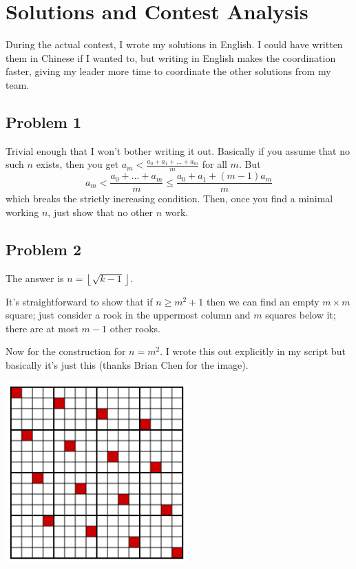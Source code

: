 \documentclass[11pt]{scrreprt}
\numberwithin{figure}{chapter}
\begin{document}
\chapter{Solutions and Contest Analysis}
\label{ch:solnsketch}
During the actual contest, I wrote my solutions in English.
I could have written them in Chinese if I wanted to, but writing in English makes
the coordination faster, giving my leader more time to coordinate the other
solutions from my team.
\section{Problem 1}
Trivial enough that I won't bother writing it out.
Basically if you assume that no such $n$ exists, then you get $a_m < \frac{a_0+a_1+ \dots + a_m}{m}$ for all $m$. But
\[ a_m < \frac{a_0+ \dots + a_m}{m} \le \frac{a_0+a_1 + (m-1)a_m}{m} \]
which breaks the strictly increasing condition.
Then, once you find a minimal working $n$, just show that no other $n$ work.

\section{Problem 2}
The answer is $n = \left\lfloor \sqrt{k-1} \right\rfloor$.

It's straightforward to show that if $n \ge m^2+1$ then we can find an empty $m \times m$ square; just consider a rook in the uppermost column and $m$ squares below it; there are at most $m-1$ other rooks.

Now for the construction for $n=m^2$. I wrote this out explicitly in my script but basically it's just this
(thanks Brian Chen for the image).

\begin{center}
  \includegraphics[width=7cm]{media/rooks.png}
\end{center}
\end{document}
